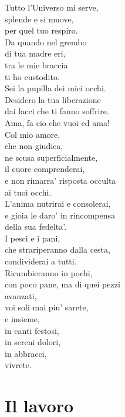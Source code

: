 \begin{haiku}
{Tutto l'Universo mi serve,\\
splende e si muove,\\
per quel tuo respiro.\\
Da quando nel grembo \\
di tua madre eri,\\
tra le mie braccia\\
ti ho custodito.\\
Sei la pupilla dei miei occhi.\\
Desidero la tua liberazione\\
dai lacci che ti fanno soffrire.\\
Ama, fa cio che vuoi ed ama!\\
Col mio amore,\\
che non giudica,\\
ne scusa superficialmente,\\
il cuore comprenderai,\\
e non rimarra' risposta occulta\\
ai tuoi occhi.\\
L'anima nutrirai e consolerai,\\
e gioia le daro' in rincompensa\\
della sua fedelta'.\\
I pesci e i pani,\\
che strariperanno dalla cesta,\\
condividerai a tutti.\\
Ricambieranno in pochi,\\
con poco pane, ma di quei pezzi\\
avanzati, \\
voi soli mai piu' sarete,\\
e insieme, \\
in canti festosi,\\
in sereni dolori,\\
in abbracci,\\
vivrete.  }\\
\end{haiku}



\section{Il lavoro}

